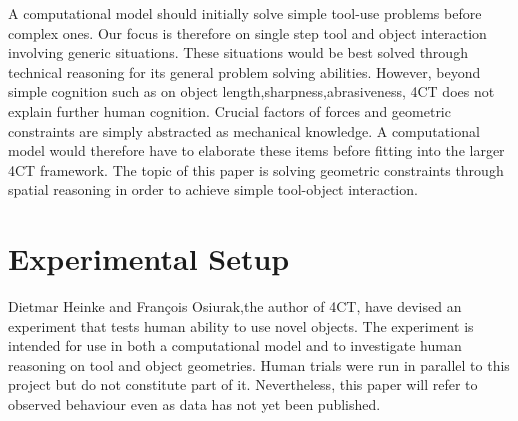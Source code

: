 \documentclass[11]{article}
\begin{document}
A computational model should initially solve simple tool-use problems before complex ones.
Our focus is therefore on single step tool and object interaction involving generic situations.
These situations would be best solved through technical reasoning for its general problem solving abilities. 
However, beyond simple cognition such as on object length,sharpness,abrasiveness, 4CT does not explain further human cognition.
Crucial factors of forces and geometric constraints are simply abstracted as mechanical knowledge. 
A computational model would therefore have to elaborate these items before fitting into the larger 4CT framework. 
The topic of this paper is solving geometric constraints through spatial reasoning in order to achieve simple tool-object interaction.  

\section{Experimental Setup}

Dietmar Heinke and Fran\c{c}ois Osiurak,the author of 4CT, have devised an experiment that tests human ability to use novel objects. 
The experiment is intended for use in both a computational model and to investigate human reasoning on tool and object geometries. 
Human trials were run in parallel to this project but do not constitute part of it. 
Nevertheless, this paper will refer to observed behaviour even as data has not yet been published. 
\end{document}
